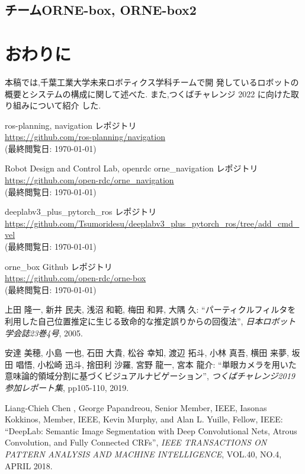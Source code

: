 \documentclass[uplatex, twocolumn, 9pt]{jsproceedings}
\begin{document}
\subsection{チームORNE-box, ORNE-box2}
\subsubsection{}

\section{おわりに}
本稿では,千葉工業大学未来ロボティクス学科チームで開
発しているロボットの概要とシステムの構成に関して述べた.
また,つくばチャレンジ 2022 に向けた取り組みについて紹介
した.

\footnotesize
\begin{thebibliography}{99}

ros-planning, navigation レポジトリ\\
\url{https://github.com/ros-planning/navigation}\\
(最終閲覧日: \today)

Robot Design and Control Lab, openrdc orne\_navigation レポジトリ\\
\url{https://github.com/open-rdc/orne_navigation}\\
(最終閲覧日: \today)

deeplabv3\_plus\_pytorch\_ros レポジトリ\\
\url{https://github.com/Tsumoridesu/deeplabv3_plus_pytorch_ros/tree/add_cmd_vel}\\
(最終閲覧日: \today)

orne\_box Github レポジトリ\\
\url{https://github.com/open-rdc/orne-box}\\
(最終閲覧日: \today)

上田 隆一, 新井 民夫, 浅沼 和範, 梅田 和昇, 大隅 久: ``パーティクルフィルタを利用した自己位置推定に生じる致命的な推定誤りからの回復法'', \textit{日本ロボット学会誌23巻4号}, 2005.

安達 美穂, 小島 一也, 石田 大貴, 松谷 幸知, 渡辺 拓斗, 小林 真吾, 横田 来夢, 坂田 唱悟, 小松崎 迅斗, 捨田利 沙羅, 宮野 龍一, 宮本 龍介: ``単眼カメラを用いた意味論的領域分割に基づくビジュアルナビゲーション'', \textit{つくばチャレンジ2019 参加レポート集}, pp105-110, 2019.

Liang-Chieh Chen , George Papandreou, Senior Member, IEEE, Iasonas Kokkinos, Member, IEEE,
Kevin Murphy, and Alan L. Yuille, Fellow, IEEE: ``DeepLab: Semantic Image Segmentation with
Deep Convolutional Nets, Atrous Convolution, and Fully Connected CRFs'', \textit{IEEE TRANSACTIONS ON PATTERN ANALYSIS AND MACHINE INTELLIGENCE}, VOL.40, NO.4, APRIL 2018.

\end{thebibliography}
\normalsize
\end{document}
